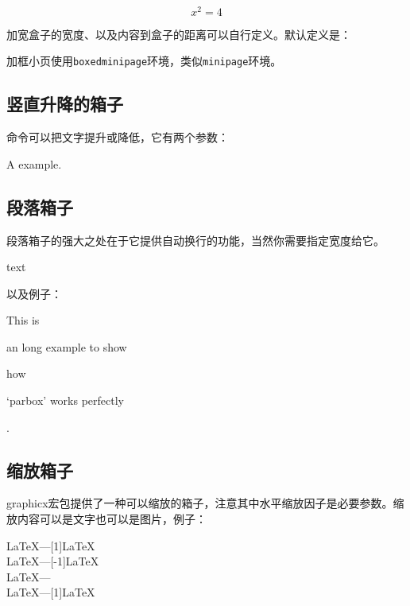 \begin{codeshow}
 \\
\begin{equation}\boxed{x^2=4}
\end{equation}
\end{codeshow}

加宽盒子的宽度、以及内容到盒子的距离可以自行定义。默认定义是：
\begin{latex}{}
\setlength{\fboxrule}{0.4pt} \setlength{\fboxsep}{3pt}
\end{latex}

加框小页使用\texttt{boxedminipage}环境，类似\texttt{minipage}环境。

\subsection{竖直升降的箱子}
命令\latexline{\\raisebox}可以把文字提升或降低，它有两个参数：
\begin{latex}{}
A\raisebox{-0.5ex}{n} example.
\end{latex}

\subsection{段落箱子}
段落箱子的强大之处在于它提供自动换行的功能，当然你需要指定宽度给它。
\begin{latex}{}
\parbox[pos]{width}{text}
\end{latex}

以及例子：

\begin{codeshow}
This is \parbox[t]{3.5em}{an long
example to show} how \parbox[b]
{4em}{`parbox' works perfectly}.
\end{codeshow}

\subsection{缩放箱子}
graphicx宏包提供了一种可以缩放的箱子\latexline{\scalebox{h-sc}[v-sc]{pbj}}，注意其中水平缩放因子是必要参数。缩放内容可以是文字也可以是图片，例子：

\begin{codeshow}
\LaTeX---\scalebox{-1}[1]{\LaTeX}\\
\LaTeX---\scalebox{1}[-1]{\LaTeX}\\
\LaTeX---\scalebox{-1}{\LaTeX}\\
\LaTeX---\scalebox{2}[1]{\LaTeX}
\end{codeshow}

